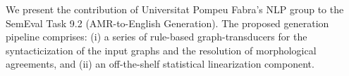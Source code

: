 We present the contribution of Universitat Pompeu Fabra's NLP group to the SemEval Task 9.2 (AMR-to-English Generation). The proposed generation pipeline comprises: (i) a series of rule-based graph-transducers for the syntacticization of the input graphs and the resolution of morphological agreements, and (ii) an off-the-shelf statistical linearization component.
